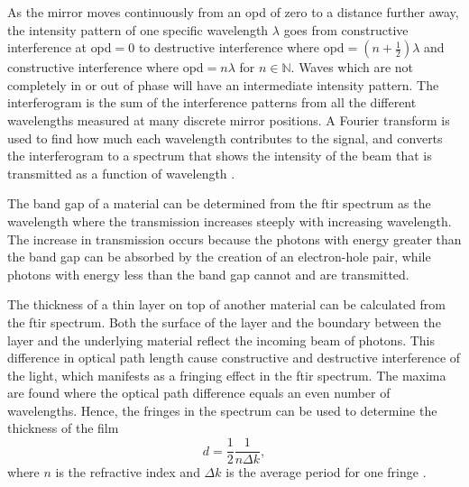 As the mirror moves continuously from an \ac{opd} of zero to a distance further away, the intensity pattern of one specific wavelength $\lambda$ goes from constructive interference at \ac{opd}$=0$ to destructive interference where \ac{opd}$=(n+\frac{1}{2}) \lambda$ and constructive interference where \ac{opd}$= n \lambda$ for $n\in\mathbb{N}$. Waves which are not completely in or out of phase will have an intermediate intensity pattern. The interferogram is the sum of the interference patterns from all the different wavelengths measured at many discrete mirror positions. A Fourier transform is used to find how much each wavelength contributes to the signal, and converts the interferogram to a spectrum that shows the intensity of the beam that is transmitted as a function of wavelength \citep{smith2011fourier}.

%
%
The band gap of a material can be determined from the \ac{ftir} spectrum as the wavelength where the transmission increases steeply with increasing wavelength. The increase in transmission occurs because the photons with energy greater than the band gap can be absorbed by the creation of an electron-hole pair, while photons with energy less than the band gap cannot and are transmitted.

The thickness of a thin layer on top of another material can be calculated from the \ac{ftir} spectrum. Both the surface of the layer and the boundary between the layer and the underlying material reflect the incoming beam of photons. This difference in optical path length cause constructive and destructive interference of the light, which manifests as a fringing effect in the \ac{ftir} spectrum. The maxima are found where the optical path difference equals an even number of wavelengths. Hence, the fringes in the spectrum can be used to determine the thickness of the film
\begin{equation}
\label{eq:ftir_thickness}
d = \frac{1}{2}\frac{1}{n\Delta k},
\end{equation}
where $n$ is the refractive index and $\Delta k$ is the average period for one fringe \citep{griffiths2007fourier, stuart2008modern}.
%
